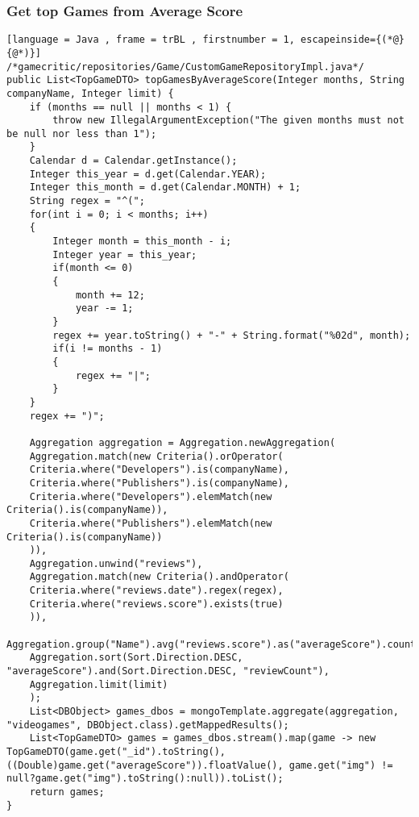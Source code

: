 \subsubsection{Get top Games from Average Score}
\begin{lstlisting}[language = Java , frame = trBL , firstnumber = 1, escapeinside={(*@}{@*)}]
/*gamecritic/repositories/Game/CustomGameRepositoryImpl.java*/
public List<TopGameDTO> topGamesByAverageScore(Integer months, String companyName, Integer limit) {
	if (months == null || months < 1) {
		throw new IllegalArgumentException("The given months must not be null nor less than 1");
	}
	Calendar d = Calendar.getInstance();
	Integer this_year = d.get(Calendar.YEAR);
	Integer this_month = d.get(Calendar.MONTH) + 1;
	String regex = "^(";
	for(int i = 0; i < months; i++)
	{
		Integer month = this_month - i;
		Integer year = this_year;
		if(month <= 0)
		{
			month += 12;
			year -= 1;
		}
		regex += year.toString() + "-" + String.format("%02d", month);
		if(i != months - 1)
		{
			regex += "|";
		}
	}
	regex += ")";
	
	Aggregation aggregation = Aggregation.newAggregation(
	Aggregation.match(new Criteria().orOperator(
	Criteria.where("Developers").is(companyName),
	Criteria.where("Publishers").is(companyName),
	Criteria.where("Developers").elemMatch(new Criteria().is(companyName)),
	Criteria.where("Publishers").elemMatch(new Criteria().is(companyName))
	)),
	Aggregation.unwind("reviews"),
	Aggregation.match(new Criteria().andOperator(
	Criteria.where("reviews.date").regex(regex),
	Criteria.where("reviews.score").exists(true)
	)),
	Aggregation.group("Name").avg("reviews.score").as("averageScore").count().as("reviewCount").first("img").as("img"),
	Aggregation.sort(Sort.Direction.DESC, "averageScore").and(Sort.Direction.DESC, "reviewCount"),
	Aggregation.limit(limit)
	);
	List<DBObject> games_dbos = mongoTemplate.aggregate(aggregation, "videogames", DBObject.class).getMappedResults();
	List<TopGameDTO> games = games_dbos.stream().map(game -> new TopGameDTO(game.get("_id").toString(), ((Double)game.get("averageScore")).floatValue(), game.get("img") != null?game.get("img").toString():null)).toList();
	return games;
}

\end{lstlisting}
